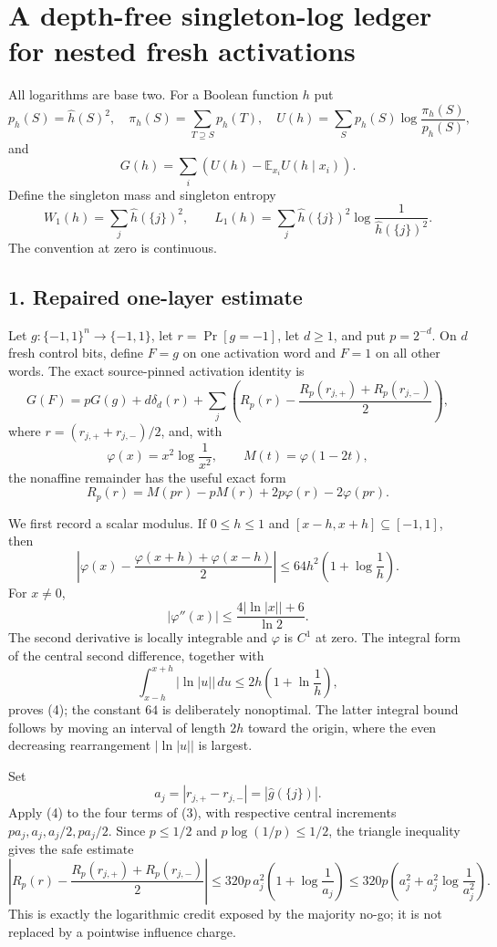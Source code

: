 \section*{A depth-free singleton-log ledger for nested fresh activations}

All logarithms are base two.  For a Boolean function $h$ put
\[
 p_h(S)=\widehat h(S)^2,\quad
 \pi_h(S)=\sum_{T\supseteq S}p_h(T),\quad
 U(h)=\sum_Sp_h(S)\log\frac{\pi_h(S)}{p_h(S)},
\]
and
\[
 G(h)=\sum_i\left(U(h)-\mathbb E_{x_i}U(h\mid x_i)\right).
\]
Define the singleton mass and singleton entropy
\[
 W_1(h)=\sum_j\widehat h(\{j\})^2,
 \qquad
 L_1(h)=\sum_j\widehat h(\{j\})^2
            \log\frac1{\widehat h(\{j\})^2}.
\tag{1}
\]
The convention at zero is continuous.

\subsection*{1. Repaired one-layer estimate}

Let $g:\{-1,1\}^n\to\{-1,1\}$, let
$r=\Pr[g=-1]$, let $d\geq1$, and put $p=2^{-d}$.  On $d$ fresh
control bits, define $F=g$ on one activation word and $F=1$ on all
other words.  The exact source-pinned activation identity is
\[
 G(F)=pG(g)+d\delta_d(r)+\sum_j
 \left(R_p(r)-\frac{R_p(r_{j,+})+R_p(r_{j,-})}{2}\right),
\tag{2}
\]
where $r=(r_{j,+}+r_{j,-})/2$, and, with
\[
 \varphi(x)=x^2\log\frac1{x^2},\qquad M(t)=\varphi(1-2t),
\]
the nonaffine remainder has the useful exact form
\[
 R_p(r)=M(pr)-pM(r)+2p\varphi(r)-2\varphi(pr).
\tag{3}
\]

We first record a scalar modulus.  If $0\leq h\leq1$ and
$[x-h,x+h]\subseteq[-1,1]$, then
\[
 \left|\varphi(x)-\frac{\varphi(x+h)+\varphi(x-h)}2\right|
 \leq64h^2\left(1+\log\frac1h\right).
\tag{4}
\]
For $x\neq0$,
\[
 |\varphi''(x)|\leq\frac{4|\ln|x||+6}{\ln2}.
\]
The second derivative is locally integrable and $\varphi$ is $C^1$ at
zero.  The integral form of the central second difference, together with
\[
 \int_{x-h}^{x+h}|\ln|u||\,du
 \leq2h\left(1+\ln\frac1h\right),
\]
proves (4); the constant $64$ is deliberately nonoptimal.  The latter
integral bound follows by moving an interval of length $2h$ toward the
origin, where the even decreasing rearrangement $|\ln|u||$ is largest.

Set
\[
 a_j=|r_{j,+}-r_{j,-}|=|\widehat g(\{j\})|.
\tag{5}
\]
Apply (4) to the four terms of (3), with respective central increments
$pa_j,a_j, a_j/2,pa_j/2$.  Since $p\leq1/2$ and
$p\log(1/p)\leq1/2$, the triangle inequality gives the safe estimate
\[
 \left|R_p(r)-\frac{R_p(r_{j,+})+R_p(r_{j,-})}{2}\right|
 \leq320p\,a_j^2\left(1+\log\frac1{a_j}\right)
 \leq320p\left(a_j^2+a_j^2\log\frac1{a_j^2}\right).
\tag{6}
\]
This is exactly the logarithmic credit exposed by the majority no-go; it
is not replaced by a pointwise influence charge.

